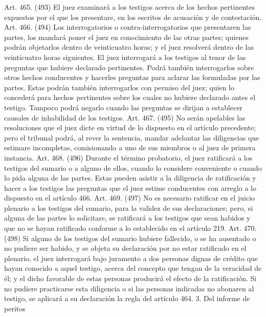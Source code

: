     Art. 465. (493) El juez examinará a los testigos acerca de los hechos pertinentes expuestos por el que los presentare, en los escritos de acusación y de contestación.
    Art. 466. (494) Los interrogatorios o contra-interrogatorios que presentaren las partes, los mandará poner el juez en conocimiento de las otras partes; quienes podrán objetarlos dentro de veinticuatro horas; y el juez resolverá dentro de las veinticuatro horas siguientes.
    El juez interrogará a los testigos al tenor de las preguntas que hubiere declarado pertinentes.
    Podrá también interrogarlos sobre otros hechos conducentes y hacerles preguntas para aclarar las formuladas por las partes.
    Estas podrán también interrogarlos con permiso del juez; quien lo concederá para hechos pertinentes sobre los cuales no hubiere declarado antes el testigo. Tampoco podrá negarlo cuando las preguntas se dirijan a establecer causales de inhabilidad de los testigos.
    Art. 467. (495) No serán apelables las resoluciones que el juez dicte en virtud de lo dispuesto en el artículo precedente; pero el tribunal podrá, al rever la sentencia, mandar adelantar las diligencias que estimare incompletas, comisionando a uno de sus miembros o al juez de primera instancia.
    Art. 468. (496) Durante el término probatorio, el juez ratificará a los testigos del sumario o a alguno de ellos, cuando lo considere conveniente o cuando lo pida alguna de las partes.
    Estas pueden asistir a la diligencia de ratificación y hacer a los testigos las preguntas que el juez estime conducentes con arreglo a lo dispuesto en el artículo 466.
    Art. 469. (497) No es necesario ratificar en el juicio plenario a los testigos del sumario, para la validez de sus declaraciones; pero, si alguna de las partes lo solicitare, se ratificará a los testigos que sean habidos y que no se hayan ratificado conforme a lo establecido en el artículo 219.
    Art. 470. (498) Si alguno de los testigos del sumario hubiere fallecido, o se ha ausentado o no pudiere ser habido, y se objeta su declaración por no estar ratificado en el plenario, el juez interrogará bajo juramento a dos personas dignas de crédito que hayan conocido a aquel testigo, acerca del concepto que tengan de la veracidad de él; y el dicho favorable de estas personas producirá el efecto de la ratificación.
    Si no pudiere practicarse esta diligencia o si las personas indicadas no abonaren al testigo, se aplicará a su declaración la regla del artículo 464.
  3. Del informe de peritos

